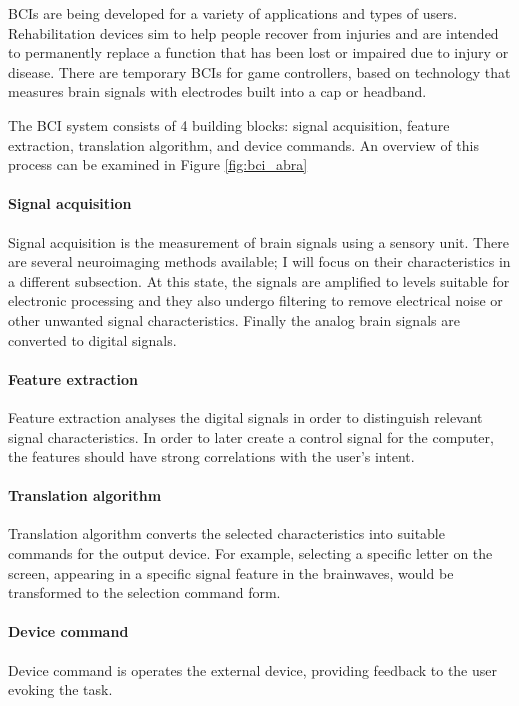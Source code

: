 \documentclass[letterpaper,10pt]{article}
\begin{document}
BCIs are being developed for a variety of applications and types of users. Rehabilitation devices sim to help people recover from injuries and are intended to permanently replace a function that has been lost or impaired due to injury or disease. There are temporary BCIs for game controllers, based on technology that measures brain signals with electrodes built into a cap or headband. \cite{utrech_neuroprosthesis}

The BCI system consists of 4 building blocks: signal acquisition,  feature extraction, translation algorithm, and  device commands. \cite{bci_abra} An overview of this process can be examined in Figure \ref{fig:bci_abra}

\paragraph{Signal acquisition} Signal acquisition is the measurement of brain signals using a sensory unit. There are several neuroimaging methods available; I will focus on their characteristics in a different subsection. At this state, the signals are amplified to levels suitable for electronic processing and they also undergo filtering to remove electrical noise or other unwanted signal characteristics. Finally the analog brain signals are converted to digital signals. \cite{kapreans}

\paragraph{Feature extraction} Feature extraction analyses the digital signals in order to distinguish relevant signal characteristics. In order to later create a control signal for the computer, the features should have strong correlations with the user's intent. \cite{kapreans}

\paragraph{Translation algorithm} Translation algorithm converts the selected characteristics into suitable commands for the output device. For example, selecting a specific letter on the screen, appearing in a specific signal feature in the brainwaves, would be transformed to the selection command form.\cite{kapreans}

\paragraph{Device command} Device command is operates the external device, providing feedback to the user evoking the task.\cite{kapreans}
\end{document}
